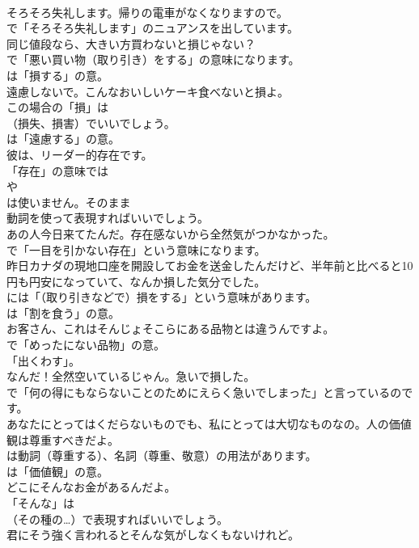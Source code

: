 \documentclass[8pt]{extreport}
\begin{document}
\begin{CJK}{UTF8}{min}
\\	そろそろ失礼します。帰りの電車がなくなりますので。 
\\	で「そろそろ失礼します」のニュアンスを出しています。	
\\	同じ値段なら、大きい方買わないと損じゃない？ 
\\	で「悪い買い物（取り引き）をする」の意味になります。
\\	は「損する」の意。	
\\	遠慮しないで。こんなおいしいケーキ食べないと損よ。 
\\	この場合の「損」は 
\\	（損失、損害）でいいでしょう。
\\	は「遠慮する」の意。	
\\	彼は、リーダー的存在です。 
\\	「存在」の意味では
\\	や
\\	は使いません。そのまま
\\	動詞を使って表現すればいいでしょう。	
\\	あの人今日来てたんだ。存在感ないから全然気がつかなかった。 
\\	で「一目を引かない存在」という意味になります。	
\\	昨日カナダの現地口座を開設してお金を送金したんだけど、半年前と比べると10円も円安になっていて、なんか損した気分でした。 
\\	には「（取り引きなどで）損をする」という意味があります。
\\	は「割を食う」の意。	
\\	お客さん、これはそんじょそこらにある品物とは違うんですよ。 
\\	で「めったにない品物」の意。
\\	「出くわす」。	
\\	なんだ！全然空いているじゃん。急いで損した。 
\\	で「何の得にもならないことのためにえらく急いでしまった」と言っているのです。	
\\	あなたにとってはくだらないものでも、私にとっては大切なものなの。人の価値観は尊重すべきだよ。 
\\	は動詞（尊重する）、名詞（尊重、敬意）の用法があります。
\\	は「価値観」の意。	
\\	どこにそんなお金があるんだよ。 
\\	「そんな」は 
\\	（その種の…）で表現すればいいでしょう。	
\\	君にそう強く言われるとそんな気がしなくもないけれど。 

\end{CJK}
\end{document}
